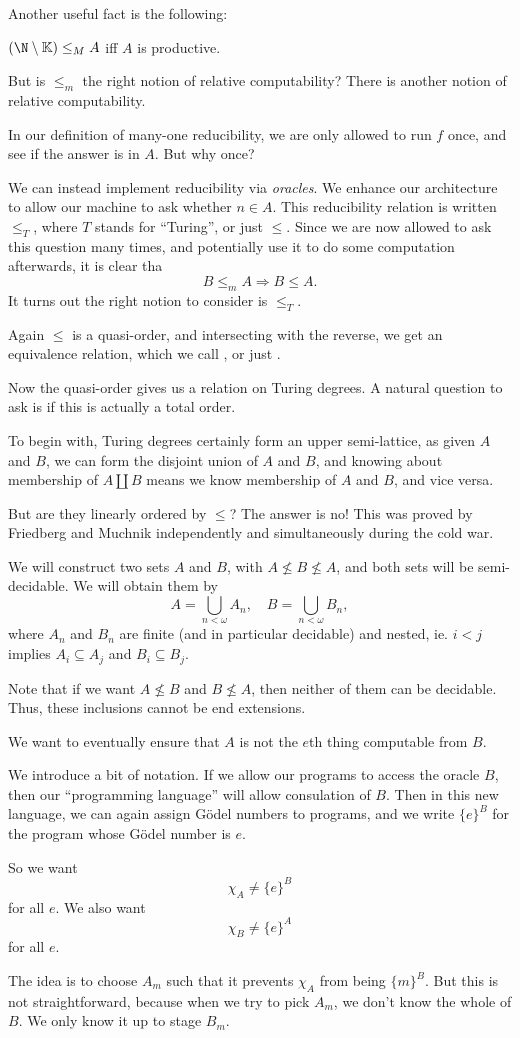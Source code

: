 \documentclass[a4paper]{article}
\newcommand\K{\mathbb{K}}
\begin{document}
Another useful fact is the following:
\begin{prop}
  $(\N \setminus \K) \leq_M A$ iff $A$ is productive.
\end{prop}

But is $\leq_m$ the right notion of relative computability? There is another notion of relative computability.

In our definition of many-one reducibility, we are only allowed to run $f$ once, and see if the answer is in $A$. But why once?

We can instead implement reducibility via \emph{oracles}. We enhance our architecture to allow our machine to ask whether $n \in A$. This reducibility relation is written $\leq_T$, where $T$ stands for ``Turing'', or just $\leq$. Since we are now allowed to ask this question many times, and potentially use it to do some computation afterwards, it is clear tha
\[
  B \leq_m A \Rightarrow B \leq A.
\]
It turns out the right notion to consider is $\leq_T$.

Again $\leq$ is a quasi-order, and intersecting with the reverse, we get an equivalence relation, which we call , or just .

Now the quasi-order gives us a relation on Turing degrees. A natural question to ask is if this is actually a total order.

To begin with, Turing degrees certainly form an upper semi-lattice, as given $A$ and $B$, we can form the disjoint union of $A$ and $B$, and knowing about membership of $A \coprod B$ means we know membership of $A$ and $B$, and vice versa.

But are they linearly ordered by $\leq$? The answer is no! This was proved by Friedberg and Muchnik independently and simultaneously during the cold war.

We will construct two sets $A$ and $B$, with $A \not\leq B \not\leq A$, and both sets will be semi-decidable. We will obtain them by
\[
  A = \bigcup_{n < \omega} A_n,\quad B = \bigcup_{n < \omega} B_n,
\]
where $A_n$ and $B_n$ are finite (and in particular decidable) and nested, ie. $i < j$ implies $A_i \subseteq A_j$ and $B_i \subseteq B_j$.

Note that if we want $A \not\leq B$ and $B \not\leq A$, then neither of them can be decidable. Thus, these inclusions cannot be end extensions.

We want to eventually ensure that $A$ is not the $e$th thing computable from $B$.

We introduce a bit of notation. If we allow our programs to access the oracle $B$, then our ``programming language'' will allow consulation of $B$. Then in this new language, we can again assign G\"odel numbers to programs, and we write $\{e\}^B$ for the program whose G\"odel number is $e$.

So we want
\[
  \chi_A \not= \{e\}^B
\]
for all $e$. We also want
\[
  \chi_B \not= \{e\}^A
\]
for all $e$.

The idea is to choose $A_m$ such that it prevents $\chi_A$ from being $\{m\}^B$. But this is not straightforward, because when we try to pick $A_m$, we don't know the whole of $B$. We only know it up to stage $B_m$.




\printindex
\end{document}
